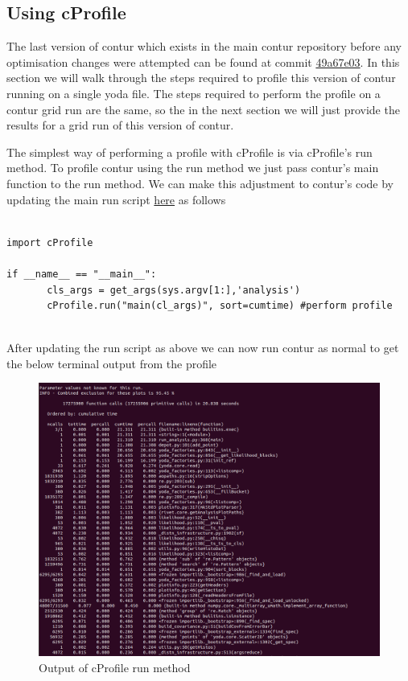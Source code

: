 \subsection{Using cProfile}
The last version of contur which exists in the main contur repository before any optimisation changes were attempted can be found at commit \href{https://gitlab.com/hepcedar/contur/-/tree/49a67e039cf93c88b39dade3dfb7c5f03e780fb2}{49a67e03}. In this section we will walk through the steps required to profile this version of contur running on a single yoda file. The steps required to perform the profile on a contur grid run are the same, so the in the next section we will just provide the results for a grid run of this version of contur.

The simplest way of performing a profile with cProfile is via cProfile's run method. To profile contur using the run method we just pass contur's main function to the run method. We can make this adjustment to contur's code by updating the main run script \href{https://gitlab.com/hepcedar/contur/-/blob/master/bin/contur}{here} as follows 

\begin{verbatim}

import cProfile

if __name__ == "__main__":
       cls_args = get_args(sys.argv[1:],'analysis')
       cProfile.run("main(cl_args)", sort=cumtime) #perform profile
       
\end{verbatim}

After updating the run script as above we can now run contur as normal to get the below terminal output from the profile

\begin{figure}[H]
\centering
\includegraphics[scale=0.35]{plots/example_profile.png}
\caption{Output of cProfile run method}
\label{fig:ep}
\end{figure}

